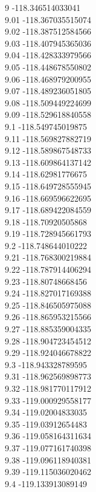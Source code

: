 {9	-118.346514033041\\
9.01	-118.367035515074\\
9.02	-118.387512584566\\
9.03	-118.407945365036\\
9.04	-118.428333979566\\
9.05	-118.448678550802\\
9.06	-118.468979200955\\
9.07	-118.489236051805\\
9.08	-118.509449224699\\
9.09	-118.529618840558\\
9.1	-118.549745019875\\
9.11	-118.569827882719\\
9.12	-118.589867548733\\
9.13	-118.609864137142\\
9.14	-118.62981776675\\
9.15	-118.649728555945\\
9.16	-118.669596622695\\
9.17	-118.689422084559\\
9.18	-118.70920505868\\
9.19	-118.728945661793\\
9.2	-118.748644010222\\
9.21	-118.768300219884\\
9.22	-118.787914406294\\
9.23	-118.80748668456\\
9.24	-118.827017169388\\
9.25	-118.846505975088\\
9.26	-118.865953215566\\
9.27	-118.885359004335\\
9.28	-118.904723454512\\
9.29	-118.924046678822\\
9.3	-118.943328789595\\
9.31	-118.962569898773\\
9.32	-118.981770117912\\
9.33	-119.000929558177\\
9.34	-119.02004833035\\
9.35	-119.03912654483\\
9.36	-119.058164311634\\
9.37	-119.077161740398\\
9.38	-119.096118940381\\
9.39	-119.115036020462\\
9.4	-119.133913089149\\
}
